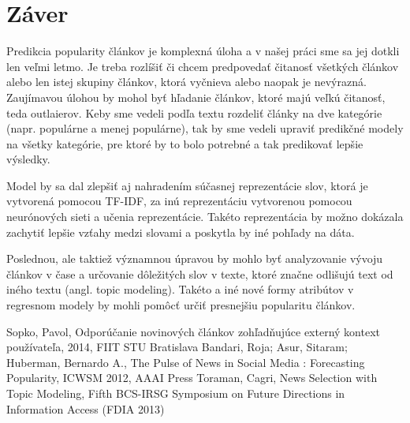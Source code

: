 \documentclass[runningheads,a4paper]{llncs}
\begin{document}
\section{Záver} 
Predikcia popularity článkov je komplexná úloha a v našej práci sme sa jej dotkli len veľmi letmo. Je treba rozlíšiť či chcem predpovedať čitanosť všetkých článkov alebo len istej skupiny článkov, ktorá vyčnieva alebo naopak je nevýrazná. Zaujímavou úlohou by mohol byť hľadanie článkov, ktoré majú veľkú čitanosť, teda outlaierov. Keby sme vedeli podľa textu rozdeliť články na dve kategórie (napr. populárne a menej populárne), tak by sme vedeli upraviť predikčné modely na všetky kategórie, pre ktoré by to bolo potrebné a tak predikovať lepšie výsledky.

Model by sa dal zlepšiť aj nahradením súčasnej reprezentácie slov, ktorá je vytvorená  pomocou TF-IDF, za inú reprezentáciu vytvorenou pomocou neurónových sieti a učenia reprezentácie. Takéto reprezentácia by možno dokázala zachytiť lepšie vzťahy medzi slovami a poskytla by iné pohľady na dáta. 

Poslednou, ale taktiež významnou úpravou by mohlo byť analyzovanie vývoju článkov v čase a určovanie dôležitých slov v texte, ktoré značne odlišujú text od iného textu (angl. topic modeling). Takéto a iné nové formy atribútov v regresnom modely by mohli pomôcť určiť presnejšiu popularitu článkov.  



\begin{thebibliography}{7}
   Sopko, Pavol, Odporúčanie novinových článkov zohľadňujúce externý kontext používateľa, 2014, FIIT STU Bratislava
   Bandari, Roja; Asur, Sitaram; Huberman, Bernardo A., The Pulse of News in Social Media : Forecasting Popularity, ICWSM 2012, AAAI Press
   Toraman, Cagri, News Selection with Topic Modeling, Fifth BCS-IRSG Symposium on Future Directions in Information Access (FDIA 2013)
\end{thebibliography}
\end{document}
